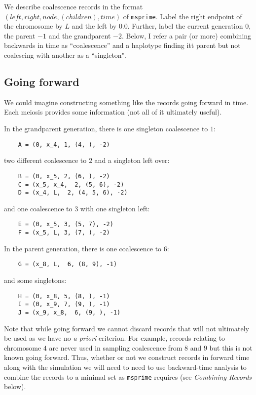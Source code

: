 \documentclass[12pt]{article}
\begin{document}

We describe coalescence records in the format $(left, right, node, (children), time)$ of {\tt msprime}.
Label the right endpoint of the chromosome by $L$ and the left by $0.0$.
Further, label the current generation $0$, the parent $-1$ and the grandparent $-2$.
Below, I refer a pair (or more) combining backwards in time as ``coalescence''
and a haplotype finding itt parent but not coalescing with another as a
``singleton".

\subsection*{Going forward}
We could imagine constructing something like the records going forward in time.
Each meiosis provides some information (not all of it ultimately useful).

In the grandparent generation, there is one singleton coalescence to $1$:
\begin{verbatim}
	A = (0, x_4, 1, (4, ), -2)
\end{verbatim}
two different coalescence to $2$ and a singleton left over:
\begin{verbatim}
	B = (0, x_5, 2, (6, ), -2)
	C = (x_5, x_4,  2, (5, 6), -2)
	D = (x_4, L,  2, (4, 5, 6), -2)
\end{verbatim}
and one coalescence to $3$ with one singleton left:
\begin{verbatim}
	E = (0, x_5, 3, (5, 7), -2)
	F = (x_5, L, 3, (7, ), -2)
\end{verbatim}

In the parent generation, there is one coalescence to $6$:
\begin{verbatim}
	G = (x_8, L,  6, (8, 9), -1)
\end{verbatim}
and some singletons:
\begin{verbatim}
	H = (0, x_8, 5, (8, ), -1)
	I = (0, x_9, 7, (9, ), -1)
	J = (x_9, x_8,  6, (9, ), -1)
\end{verbatim}

Note that while going forward we cannot discard records that will not ultimately be used
as we have no {\it a priori} criterion.
For example, records relating to chromosome $4$ are never used in sampling
coalescence from $8$ and $9$ but this is not known going forward.
Thus, whether or not we construct records in forward time along with the simulation
we will need to need to use backward-time analysis to combine the records to a
minimal set as {\tt msprime} requires (see {\it Combining Records} below).
\end{document}
